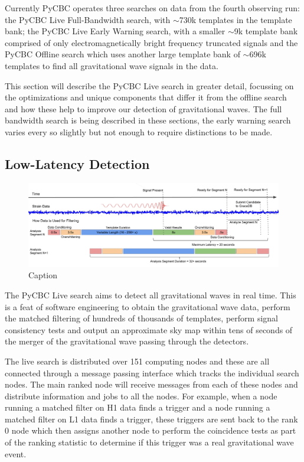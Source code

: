 Currently PyCBC operates three searches on data from the fourth observing run: the PyCBC Live Full-Bandwidth search, with $\sim$730k templates in the template bank; the PyCBC Live Early Warning search, with a smaller $\sim$9k template bank comprised of only electromagnetically bright frequency truncated signals and the PyCBC Offline search which uses another large template bank of $\sim$696k templates to find all gravitational wave signals in the data.

This section will describe the PyCBC Live search in greater detail, focussing on the optimizations and unique components that differ it from the offline search and how these help to improve our detection of gravitational waves. The full bandwidth search is being described in these sections, the early warning search varies every so slightly but not enough to require distinctions to be made.

\subsection{\label{2:sec:low-latency-detection}Low-Latency Detection}
%
\begin{figure}
    \centering
    \includegraphics[width=1.0\linewidth]{images/2_searches/live_latency_diagram.pdf}
    \caption{Caption}
    \label{2:fig:live_latency_diagram}
\end{figure}
%
The PyCBC Live search aims to detect all gravitational waves in real time. This is a feat of software engineering to obtain the gravitational wave data, perform the matched filtering of hundreds of thousands of templates, perform signal consistency tests and output an approximate sky map within tens of seconds of the merger of the gravitational wave passing through the detectors.

The live search is distributed over 151 computing nodes and these are all connected through a message passing interface which tracks the individual search nodes. The main ranked node will receive messages from each of these nodes and distribute information and jobs to all the nodes. For example, when a node running a matched filter on H1 data finds a trigger and a node running a matched filter on L1 data finds a trigger, these triggers are sent back to the rank 0 node which then assigns another node to perform the coincidence tests as part of the ranking statistic to determine if this trigger was a real gravitational wave event.

